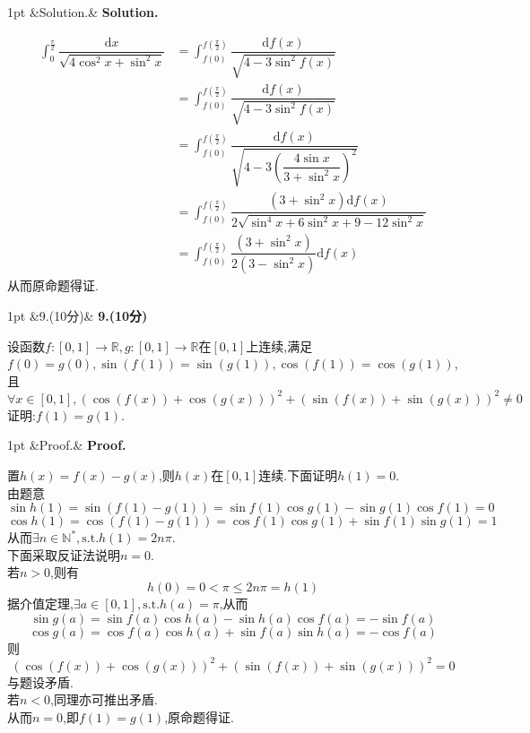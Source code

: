 \documentclass{ctexart}
\newcommand{\di}{\mathrm{d}}
\newcommand{\R}{\mathbb{R}}
\newcommand{\N}{\mathbb{N}}
\newcommand{\st}{,\text{s.t.}}
\newcommand{\dx}{\di x}
\newenvironment{solution}[1][]{%
\def\FrameCommand{%
\hspace{1pt}%
{\color{solutionline}\vrule width 2pt}%
{\color{solutionshade}\vrule width 4pt}%
\colorbox{solutionshade}%
}%
\MakeFramed{\advance\hsize-\width\FrameRestore}%
\noindent\hspace{-4.55pt}%
\begin{adjustwidth}{}{1pt}%
\setlength{\parindent}{0pt}%
\vspace{3pt}%
\ifx&#1&\else %
    \textbf{#1}\par\vspace{1pt}%
\fi
}
{%
\vspace{2pt}%
\end{adjustwidth}\endMakeFramed%
}
\newenvironment{problem}[1][]{%
\def\FrameCommand{%
\hspace{1pt}%
{\color{problemline}\vrule width 2pt}%
{\color{problemshade}\vrule width 4pt}%
\colorbox{problemshade}%
}%
\MakeFramed{\advance\hsize-\width\FrameRestore}%
\noindent\hspace{-4.55pt}%
\begin{adjustwidth}{}{1pt}%
\setlength{\parindent}{0pt}%
\vspace{3pt}%
\ifx&#1&\else %
    \textbf{#1}\par\vspace{1pt}%
\fi
}
{%
\vspace{2pt}%
\end{adjustwidth}\endMakeFramed%
}
\begin{document}
\begin{solution}[Solution.]
\begin{enumerate}[label=\textbf{(\arabic*)}]
\begin{align*}
                \int_{0}^{\frac{\pi}{2}}{\dfrac{\dx}{\sqrt{4\cos^2{x}+\sin^2{x}}}}
                &= \int_{f(0)}^{f\left(\frac{\pi}{2}\right)}{\dfrac{\di f(x)}{\sqrt{4-3\sin^2{f(x)}}}} \\
                &= \int_{f(0)}^{f\left(\frac{\pi}{2}\right)}{\dfrac{\di f(x)}{\sqrt{4-3\sin^2{f(x)}}}} \\
                &= \int_{f(0)}^{f\left(\frac{\pi}{2}\right)}{\dfrac{\di f(x)}{\sqrt{4-3\left(\dfrac{4\sin x}{3+\sin^2 x}\right)^2}}} \\
                &= \int_{f(0)}^{f\left(\frac{\pi}{2}\right)}{\dfrac{\left(3+\sin^2 x\right)\di f(x)}{2\sqrt{\sin^4 x+6\sin^2 x+9-12\sin^2 x}}} \\
                &= \int_{f(0)}^{f\left(\frac{\pi}{2}\right)}\dfrac{\left(3+\sin^2 x\right)}{2\left(3-\sin^2 x\right)}\di f(x)
            \end{align*}
            从而原命题得证.
    \end{enumerate}
\end{solution}
\begin{problem}[9.(10分)]
    设函数$f:[0,1]\to\R,g:[0,1]\to\R$在$[0,1]$上连续,满足$f(0)=g(0),\sin(f(1))=\sin(g(1)),\cos(f(1))=\cos(g(1))$,且
    $$\forall x\in[0,1],\left(\cos(f(x))+\cos(g(x))\right)^2+\left(\sin(f(x))+\sin(g(x))\right)^2\neq 0$$
    证明:$f(1)=g(1)$.
\end{problem}
\begin{solution}[Proof.]
    置$h(x)=f(x)-g(x)$,则$h(x)$在$[0,1]$连续.下面证明$h(1)=0$.\\
    由题意$$\sin h(1)=\sin \left(f(1)-g(1)\right)=\sin f(1)\cos g(1)-\sin g(1)\cos f(1)=0$$
    $$\cos h(1)=\cos \left(f(1)-g(1)\right)=\cos f(1)\cos g(1)+\sin f(1)\sin g(1)=1$$
    从而$\exists n\in\N^*\st h(1)=2n\pi$.\\
    下面采取反证法说明$n=0$.\\
    若$n>0$,则有$$h(0)=0<\pi\leqslant 2n\pi=h(1)$$
    据介值定理,$\exists a\in[0,1]\st h(a)=\pi$,从而
    $$\sin g(a)=\sin f(a)\cos h(a)-\sin h(a)\cos f(a)=-\sin f(a)$$
    $$\cos g(a)=\cos f(a)\cos h(a)+\sin f(a)\sin h(a)=-\cos f(a)$$
    则$$\left(\cos(f(x))+\cos(g(x))\right)^2+\left(\sin(f(x))+\sin(g(x))\right)^2=0$$与题设矛盾.\\
    若$n<0$,同理亦可推出矛盾.\\
    从而$n=0$,即$f(1)=g(1)$,原命题得证.
\end{solution}
\end{document}
